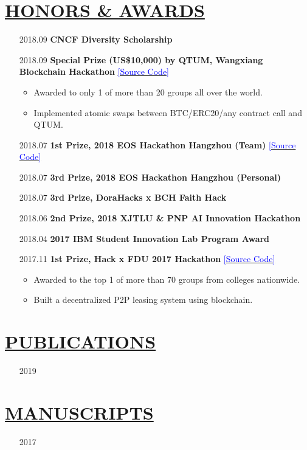 \documentclass[11pt]{article}
\begin{document}
\section*{\centering\underline{HONORS \& AWARDS}}
\begin{itemize}[noitemsep, nolistsep]
    \item[2018.09]\textbf{CNCF Diversity Scholarship}
    \item[2018.09]\textbf{Special Prize (US\$10,000) by QTUM, Wangxiang Blockchain Hackathon} \href{https://github.com/PRIEWIENV/QtumSwap}{\textcolor{blue}{[Source Code]}}
        \begin{itemize}[noitemsep, nolistsep]
            \small
            \item Awarded to only 1 of more than 20 groups all over the world. 
            \item Implemented atomic swaps between BTC/ERC20/any contract call and QTUM.
        \end{itemize} 
    \item[2018.07]\textbf{1st Prize, 2018 EOS Hackathon Hangzhou (Team)} \href{https://github.com/Acappella-dream}{\textcolor{blue}{[Source Code]}}
    \item[2018.07]\textbf{3rd Prize, 2018 EOS Hackathon Hangzhou (Personal)}
    \item[2018.07]\textbf{3rd Prize, DoraHacks x BCH Faith Hack}
    \item[2018.06]\textbf{2nd Prize, 2018 XJTLU \& PNP AI Innovation Hackathon}
    \item[2018.04]\textbf{2017 IBM Student Innovation Lab Program Award}
    \item[2017.11]\textbf{1st Prize, Hack x FDU 2017 Hackathon} \href{https://github.com/dexhunter/hackxfdu-DSharing}{\textcolor{blue}{[Source Code]}}
        \begin{itemize}[noitemsep, nolistsep]
            \small
            \item Awarded to the top 1 of more than 70 groups from colleges nationwide.
            \item Built a decentralized P2P leasing system using blockchain. 
        \end{itemize} 
\end{itemize}




\section*{\centering\underline{PUBLICATIONS}}
\begin{itemize}
    \item[2019] 
\end{itemize}
\section*{\centering\underline{MANUSCRIPTS}}
\begin{itemize}
    \item[2017] 
\end{itemize}
\end{document}
